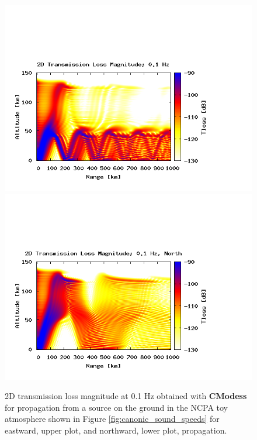 \begin{figure}
\begin{center}
\includegraphics[scale=0.45,trim = 20 20 110 140,clip]{figs/cmodess_ex2}
\includegraphics[scale=0.45,trim = 20 20 110 140,clip]{figs/2D_cmodess_ex_N}
\end{center}
\caption{2D transmission loss magnitude at 0.1 Hz obtained with {\bf CModess} for propagation from a source on the ground in the NCPA toy atmosphere shown in Figure \ref{fig:canonic_sound_speeds} for eastward, upper plot, and northward, lower plot, propagation.}
\label{fig: cmodess 2D tl}
\end{figure}

